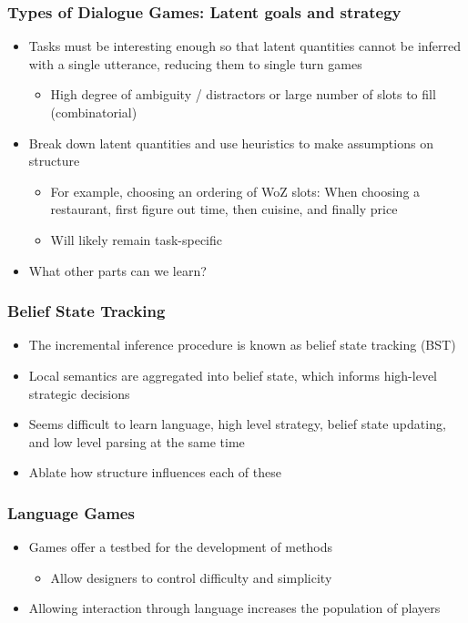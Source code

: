 \documentclass{beamer}
\begin{document}
\begin{frame}
\frametitle{Types of Dialogue Games: Latent goals and strategy}
\begin{itemize}
\item Tasks must be interesting enough so that
    latent quantities cannot be inferred with a single utterance,
    reducing them to single turn games
    \begin{itemize}
    \item High degree of ambiguity / distractors
        or large number of slots to fill (combinatorial)
    \end{itemize}
\item Break down latent quantities and use heuristics
    to make assumptions on structure
    \begin{itemize}
    \item For example, choosing an ordering of WoZ slots:
        When choosing a restaurant, first figure out
        time, then cuisine, and finally price
    \item Will likely remain task-specific
    \end{itemize}
\item What other parts can we learn?
\end{itemize}
\end{frame}

\begin{frame}
\frametitle{Belief State Tracking}
\begin{itemize}
\item The incremental inference procedure is known as belief state tracking (BST)
\item Local semantics are aggregated into belief state, which informs
    high-level strategic decisions
\item Seems difficult to learn language, high level strategy,
    belief state updating, and low level parsing at the same time
\item Ablate how structure influences each of these
\end{itemize}
\end{frame}


\begin{frame}
\frametitle{Language Games}

\begin{itemize}
\item Games offer a testbed for the development of methods
    \begin{itemize}
    \item Allow designers to control difficulty and simplicity
    \end{itemize}
\item Allowing interaction through language increases the population of players
\end{itemize}
\end{frame}
\end{document}

